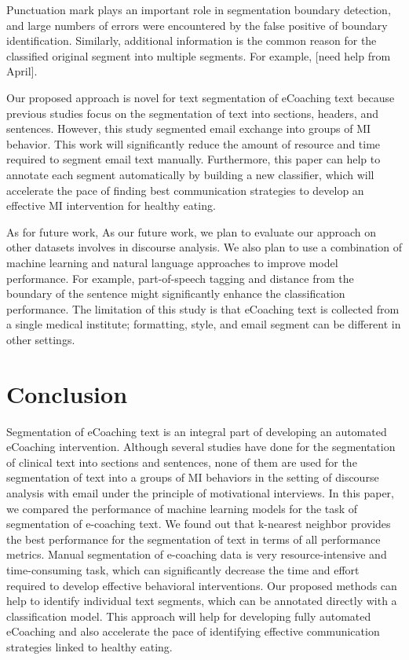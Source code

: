 \documentclass{amia}
\begin{document}
Punctuation mark plays an important role in segmentation boundary detection, and large numbers of errors were encountered by the false positive of boundary identification. Similarly, additional information is the common reason for the classified original segment into multiple segments. For example, [need help from April].

Our proposed approach is novel for text segmentation of eCoaching text because previous studies focus on the segmentation of text into sections, headers, and sentences. However, this study segmented email exchange into groups of MI behavior. This work will significantly reduce the amount of resource and time required to segment email text manually. Furthermore, this paper can help to annotate each segment automatically by building a new classifier, which will accelerate the pace of finding best communication strategies to develop an effective MI intervention for healthy eating.

As for future work, As our future work, we plan to evaluate our approach on other datasets involves in discourse analysis. We also plan to use a combination of machine learning and natural language approaches to improve model performance. For example, part-of-speech tagging and distance from the boundary of the sentence might significantly enhance the classification performance. The limitation of this study is that eCoaching text is collected from a single medical institute; formatting, style, and email segment can be different in other settings.
 
\section*{Conclusion}
Segmentation of eCoaching text is an integral part of developing an automated eCoaching intervention. Although several studies have done for the segmentation of clinical text into sections and sentences, none of them are used for the segmentation of text into a groups of MI behaviors in the setting of discourse analysis with email under the principle of motivational interviews. In this paper, we compared the performance of machine learning models for the task of segmentation of e-coaching text. We found out that k-nearest neighbor provides the best performance for the segmentation of text in terms of all performance metrics. Manual segmentation of e-coaching data is very resource-intensive and time-consuming task, which can significantly decrease the time and effort required to develop effective behavioral interventions. Our proposed methods can help to identify individual text segments, which can be annotated directly with a classification model. This approach will help for developing fully automated eCoaching and also accelerate the pace of identifying effective communication strategies linked to healthy eating.
\end{document}
